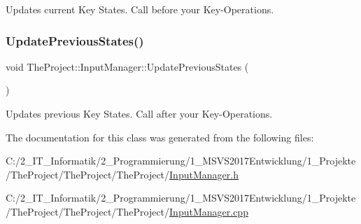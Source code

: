 Updates current Key States. Call before you\textquotesingle{}r Key-\/\+Operations. 

\mbox{\label{class_the_project_1_1_input_manager_aefc6ce350e1ab78cc3aaef145c55a65a}} 
\subsubsection{\texorpdfstring{Update\+Previous\+States()}{UpdatePreviousStates()}}
{\footnotesize\ttfamily void The\+Project\+::\+Input\+Manager\+::\+Update\+Previous\+States (\begin{DoxyParamCaption}{ }\end{DoxyParamCaption})}



Updates previous Key States. Call after you\textquotesingle{}r Key-\/\+Operations. 



The documentation for this class was generated from the following files\+:\begin{DoxyCompactItemize}
\item 
C\+:/2\+\_\+\+I\+T\+\_\+\+Informatik/2\+\_\+\+Programmierung/1\+\_\+\+M\+S\+V\+S2017\+Entwicklung/1\+\_\+\+Projekte/\+The\+Project/\+The\+Project/\+The\+Project/\mbox{\hyperlink{_input_manager_8h}{Input\+Manager.\+h}}\item 
C\+:/2\+\_\+\+I\+T\+\_\+\+Informatik/2\+\_\+\+Programmierung/1\+\_\+\+M\+S\+V\+S2017\+Entwicklung/1\+\_\+\+Projekte/\+The\+Project/\+The\+Project/\+The\+Project/\mbox{\hyperlink{_input_manager_8cpp}{Input\+Manager.\+cpp}}\end{DoxyCompactItemize}
